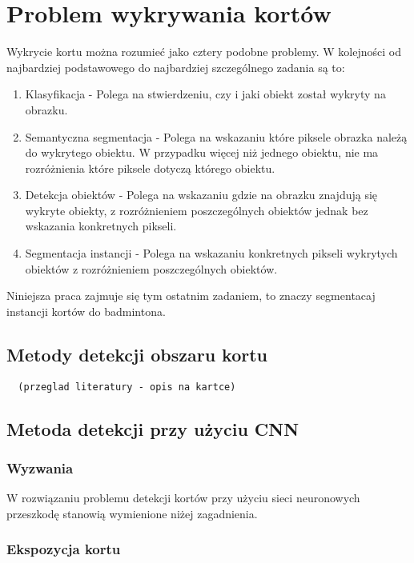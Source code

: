 \chapter{Problem wykrywania kortów}

Wykrycie kortu można rozumieć jako cztery podobne problemy. W kolejności od najbardziej podstawowego do najbardziej szczególnego zadania są to:

\begin{enumerate}
	\item Klasyfikacja - Polega na stwierdzeniu, czy i jaki obiekt został wykryty na obrazku.
	\item Semantyczna segmentacja - Polega na wskazaniu które piksele obrazka należą do wykrytego obiektu. W przypadku więcej niż jednego obiektu, nie ma rozróżnienia które piksele dotyczą którego obiektu.
	\item Detekcja obiektów - Polega na wskazaniu gdzie na obrazku znajdują się wykryte obiekty, z rozróżnieniem poszczególnych obiektów jednak bez wskazania konkretnych pikseli.
	\item Segmentacja instancji - Polega na wskazaniu konkretnych pikseli wykrytych obiektów z rozróżnieniem poszczególnych obiektów.
\end{enumerate}

Niniejsza praca zajmuje się tym ostatnim zadaniem, to znaczy segmentacaj instancji kortów do badmintona.

\section{Metody detekcji obszaru kortu}

\begin{verbatim}
  (przeglad literatury - opis na kartce)
\end{verbatim}

\section{Metoda detekcji przy użyciu CNN}

\subsection{Wyzwania}

W rozwiązaniu problemu detekcji kortów przy użyciu sieci neuronowych przeszkodę stanowią wymienione niżej zagadnienia.

\subsection*{Ekspozycja kortu}

